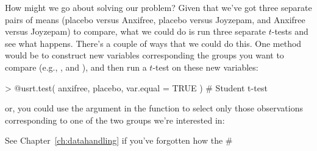 How might we go about solving our problem? Given that we've got three separate pairs of means (placebo versus Anxifree, placebo versus Joyzepam, and Anxifree versus Joyzepam) to compare, what we could do is run three separate $t$-tests and see what happens. There's a couple of ways that we could do this. One method would be to construct new variables corresponding the groups you want to compare (e.g., ,  and ), and then run a $t$-test on these new variables:
\begin{rblock1}
> @usr{t.test( anxifree, placebo, var.equal = TRUE )}   # Student t-test
\end{rblock1}
or, you could use the  argument in the  function to select only those observations corresponding to one of the two groups we're interested in:
See Chapter~\ref{ch:datahandling} if you've forgotten how the \rtextverb#%

